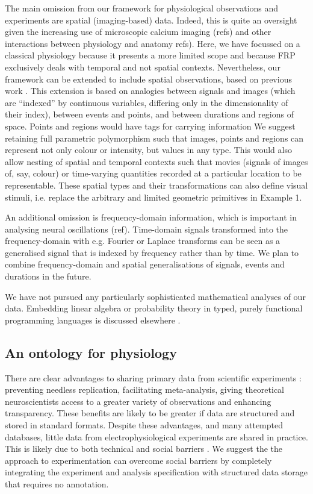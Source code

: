 The main omission from our framework for physiological observations
and experiments are spatial (imaging-based) data. Indeed, this is
quite an oversight given the increasing use of microscopic calcium
imaging (refs) and other interactions between physiology and anatomy
refs). Here, we have focussed on a classical physiology because it
presents a more limited scope and because FRP exclusively deals with
temporal and not spatial contexts. Nevertheless, our framework can be
extended to include spatial observations, based on previous work
\citep{Elliott2003}. This extension is based on analogies between
signals and images (which are ``indexed'' by continuous variables,
differing only in the dimensionality of their index), between events
and points, and between durations and regions of space. Points and
regions would have tags for carrying information We suggest retaining
full parametric polymorphism such that images, points and regions can
represent not only colour or intensity, but values in any type. This
would also allow nesting of spatial and temporal contexts such that
movies (signals of images of, say, colour) or time-varying quantities
recorded at a particular location \citep[for instance spot calcium
  measurements;][]{DiGregorio1999} to be representable. These spatial
types and their transformations can also define visual stimuli,
i.e. replace the arbitrary and limited geometric primitives in Example
1.

An additional omission is frequency-domain information, which is
important in analysing neural oscillations (ref). Time-domain signals
transformed into the frequency-domain with e.g. Fourier or Laplace
transforms can be seen as a generalised signal that is indexed by
frequency rather than by time. We plan to combine frequency-domain and
spatial generalisations of signals, events and durations in the future.

We have not pursued any particularly sophisticated mathematical
analyses of our data. Embedding linear algebra or probability theory
in typed, purely functional programming languages is discussed
elsewhere \citep{Eaton2006, Park2005}.

\subsection*{An ontology for physiology}

There are clear advantages to sharing primary data from scientific
experiments \citep{Insel2003}: preventing needless replication,
facilitating meta-analysis, giving theoretical neuroscientists access
to a greater variety of observations and enhancing transparency. These
benefits are likely to be greater if data are structured and stored in
standard formats. Despite these advantages, and many attempted
databases, little data from electrophysiological experiments are
shared in practice. This is likely due to both technical and social
barriers \citep{Amari2002}. We suggest the the approach to
experimentation can overcome social barriers by completely integrating
the experiment and analysis specification with structured data storage
that requires no annotation. 

